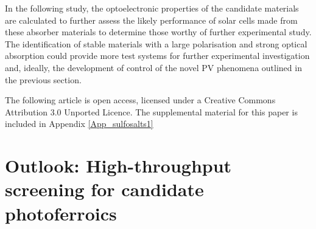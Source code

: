 \documentclass[11pt, twoside]{report}
\begin{document}
In the following study, the optoelectronic properties of the candidate materials are calculated to further assess the likely performance of solar cells made from these absorber materials to determine those worthy of further experimental study. The identification of stable materials with a large polarisation and strong optical absorption could provide more test systems for further experimental investigation and, ideally, the development of control of the novel PV phenomena outlined in the previous section.


The following article is open access, licensed under a Creative Commons Attribution 3.0 Unported Licence. The supplemental material for this paper is included in Appendix \ref{App_sulfosalts1}






\section{Outlook: High-throughput screening for candidate photoferroics}
\end{document}
